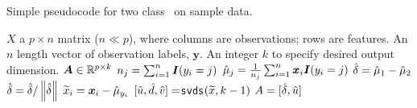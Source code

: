 \begin{algorithm}[h!]
\caption{Simple pseudocode for two class \Lol~on sample data.}
\label{alg:LOL.train}
\begin{algorithmic}[1]
\Require $X$ a $p \times n$ matrix ($n \ll p$), where columns are observations; rows are
features.  An $n$ length vector of observation labels, $\mathbf y$.  
An integer $k$ to specify desired output dimension.
\Ensure $\boldsymbol{A} \in \mathbb{R}^{p \times k}$
%
\State ${n}_j = \sum_{i=1}^n \boldsymbol{I}(y_i = j) $ 
\State $\hat{\mu}_j = \frac{1}{n_j} \sum_{i=1}^n \boldsymbol{x}_i \boldsymbol{I}(y_i=j)$ 
\EndFor
\State $\hat{\delta} = \hat{\mu}_1 - \hat{\mu}_2$ 
\State $\hat{\delta} = \hat{\delta} / \left \lVert\hat{\delta} \right \rVert$ 
\State $\widetilde{x}_i = \boldsymbol{x}_i - \hat{\mu}_{y_i}$ 
\EndFor
\State $[\hat{u},\hat{d},\hat{v}]=$\texttt{svds}$(\widetilde{x},k-1)$ 
\State $A=[\hat{\delta}, \hat{u}]$ 



\EndFunction
\end{algorithmic}
\end{algorithm}
